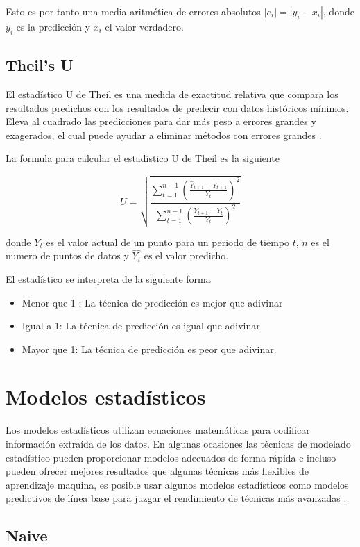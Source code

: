 Esto es por tanto una media aritmética de errores absolutos $\left|e_{i}\right| = \left|y_{i}-x_{i}\right|$, donde $y_i$ es la predicción y $x_i$ el valor verdadero.

\subsection{Theil's U}

El estadístico U de Theil es una medida de exactitud relativa que compara los resultados predichos con los resultados de predecir con datos históricos mínimos. Eleva al cuadrado las predicciones para dar más peso a errores grandes y exagerados, el cual puede ayudar a eliminar métodos con errores grandes \cite{OracleCrystalBall}.

La formula para calcular el estadístico U de Theil es la siguiente

\[
U=\sqrt{\frac{\sum_{t=1}^{n-1}\left(\frac{\hat{Y}_{t+1}-Y_{t+1}}{Y_{t}}\right)^{2}}{\sum_{t=1}^{n-1}\left(\frac{Y_{t+1}-Y_{t}}{Y_{t}}\right)^{2}}}
\]

donde $Y_t$ es el valor actual de un punto para un periodo de tiempo $t$, $n$ es el numero de puntos de datos y $\hat{Y_t}$ es el valor predicho.

El estadístico se interpreta de la siguiente forma

\begin{itemize}
	\item Menor que 1 : La técnica de predicción es mejor que adivinar
	\item  Igual a 1: La técnica de predicción es igual que adivinar
	\item Mayor que 1: La técnica de predicción es peor que adivinar.
\end{itemize}

\section{Modelos estadísticos}
\label{modelosestadisticos}
Los modelos estadísticos utilizan ecuaciones matemáticas para codificar información extraída de los datos. En algunas ocasiones las técnicas de modelado estadístico pueden proporcionar modelos adecuados de forma rápida e incluso pueden ofrecer mejores resultados que algunas técnicas más flexibles de aprendizaje maquina, es posible usar algunos modelos estadísticos como modelos predictivos de línea base para juzgar el rendimiento de técnicas más avanzadas \cite{IBMDocs2021}. 

\subsection{Naive}

